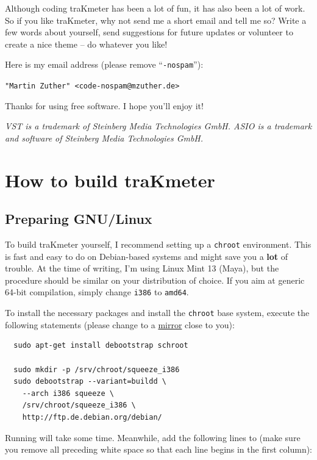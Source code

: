 Although coding traKmeter has been a lot of fun, it has also been a
lot of work.  So if you like traKmeter, why not send me a short email
and tell me so?  Write a few words about yourself, send suggestions
for future updates or volunteer to create a nice theme -- do whatever
you like!

Here is my email address (please remove ``\texttt{-nospam}''):

\begin{center}
  \texttt{"Martin Zuther" <code-nospam@mzuther.de>}
\end{center}

Thanks for using free software.  I hope you'll enjoy it!

\emph{VST is a trademark of Steinberg Media Technologies GmbH.  ASIO
  is a trademark and software of Steinberg Media Technologies GmbH.}

\appendix

\chapter{How to build traKmeter}
\label{chap:build_trakmeter}

\section{Preparing GNU/Linux}

To build traKmeter yourself, I recommend setting up a \texttt{chroot}
environment.  This is fast and easy to do on Debian-based systems and
might save you a \textbf{lot} of trouble.  At the time of writing, I'm
using Linux Mint 13 (Maya), but the procedure should be similar on
your distribution of choice.  If you aim at generic \num{64}-bit
compilation, simply change \texttt{i386} to \texttt{amd64}.

To install the necessary packages and install the \texttt{chroot} base
system, execute the following statements (please change
 to a
\href{http://www.debian.org/mirror/list}{mirror} close to you):

\begin{verbatim}
  sudo apt-get install debootstrap schroot

  sudo mkdir -p /srv/chroot/squeeze_i386
  sudo debootstrap --variant=buildd \
    --arch i386 squeeze \
    /srv/chroot/squeeze_i386 \
    http://ftp.de.debian.org/debian/
\end{verbatim}

Running  will take some time.  Meanwhile, add the
following lines to  (make sure you
remove all preceding white space so that each line begins in the first
column):

